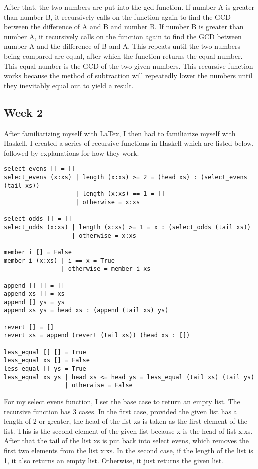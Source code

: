 \documentclass{article}
\theoremstyle{theorem}
\theoremstyle{definition}
\theoremstyle{remark}
\begin{document}
\medskip\noindent
After that, the two numbers are put into the gcd function. If number A is greater than number B, it recursively calls on the function again to find the GCD between the difference of A and B and number B. If number B is greater than number A, it recursively calls on the function again to find the GCD between number A and the difference of B and A. This repeats until the two numbers being compared are equal, after which the function returns the equal number. This equal number is the GCD of the two given numbers. This recursive function works because the method of subtraction will repeatedly lower the numbers until they inevitably equal out to yield a result.

\subsection{Week 2}

After familiarizing myself with LaTex, I then had to familiarize myself with Haskell. I created a series of recursive functions in Haskell which are listed below, followed by explanations for how they work.

\begin{lstlisting}
select_evens [] = []
select_evens (x:xs) | length (x:xs) >= 2 = (head xs) : (select_evens (tail xs))
                    | length (x:xs) == 1 = []
                    | otherwise = x:xs

select_odds [] = []
select_odds (x:xs) | length (x:xs) >= 1 = x : (select_odds (tail xs))
                   | otherwise = x:xs

member i [] = False
member i (x:xs) | i == x = True
                | otherwise = member i xs

append [] [] = []
append xs [] = xs
append [] ys = ys
append xs ys = head xs : (append (tail xs) ys)

revert [] = []
revert xs = append (revert (tail xs)) (head xs : [])

less_equal [] [] = True
less_equal xs [] = False
less_equal [] ys = True
less_equal xs ys | head xs <= head ys = less_equal (tail xs) (tail ys)
                 | otherwise = False
\end{lstlisting}
%
For my select evens function, I set the base case to return an empty list. The recursive function has 3 cases. In the first case, provided the given list has a length of 2 or greater, the head of the list xs is taken as the first element of the list. This is the second element of the given list because x is the head of list x:xs. After that the tail of the list xs is put back into select evens, which removes the first two elements from the list x:xs. In the second case, if the length of the list is 1, it also returns an empty list. Otherwise, it just returns the given list.
\end{document}
